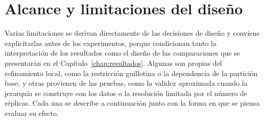 \section{Alcance y limitaciones del diseño}\label{sec:prop-limitaciones}

Varias limitaciones se derivan directamente de las decisiones de diseño y
conviene explicitarlas antes de los experimentos, porque condicionan tanto la
interpretación de los resultados como el diseño de las comparaciones que se
presentarán en el Capítulo~\ref{chap:resultados}. Algunas son propias del
refinamiento local, como la restricción guillotina o la dependencia de la
partición base, y otras provienen de las pruebas, como la validez aproximada
cuando la jerarquía se construye con los datos o la resolución limitada por el
número de réplicas. Cada una se describe a continuación junto con la forma en
que se piensa evaluar su efecto.

